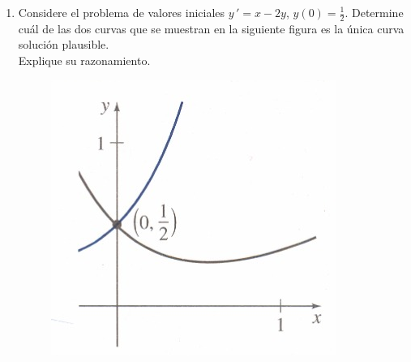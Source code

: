 \documentclass[letterpaper,10pt]{memoir}
\begin{document}
\begin{enumerate}
\begin{minipage}{0.6\linewidth}
		\end{minipage}
	\item Considere el problema de valores iniciales \(y \,' =x-2y\), \(y(0) = \frac 12\). Determine cuál de las dos curvas que se muestran en la siguiente figura es la única curva solución plausible.\\Explique su razonamiento.
		\begin{figure}[ht]
			\centering
			\includegraphics[width= 0.5 \linewidth]{IMAGENES/images/image10.png}
		\end{figure}
\end{enumerate}
\end{document}
